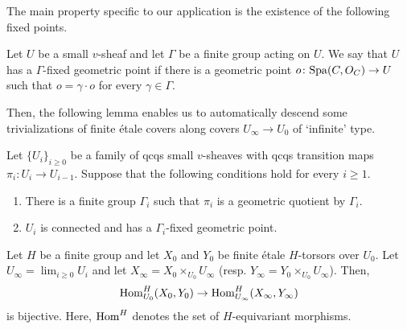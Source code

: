 \documentclass[12pt,reqno]{amsart}
\begin{document}
The main property specific to our application is the existence of the following fixed points. 

\begin{defi}
    Let $U$ be a small $v$-sheaf and let $\Gamma$ be a finite group acting on $U$. We say that $U$ has a $\Gamma$-fixed geometric point if there is a geometric point $o\colon {\operatorname{Spa}}(C,O_C) \to U$ such that $o = \gamma \cdot o$ for every $\gamma \in \Gamma$.  
\end{defi}

Then, the following lemma enables us to automatically descend some trivializations of finite \'{e}tale covers along covers $U_\infty \to U_0$ of `infinite' type. 

\begin{prop} \label{prop:descent_finite_etale_map}
    Let $\{U_i\}_{i\geq 0}$ be a family of qcqs small $v$-sheaves with qcqs transition maps $\pi_i \colon U_{i} \to U_{i-1}$. Suppose that the following conditions hold for every $i\geq 1$. 
    \begin{enumerate}
        \item There is a finite group $\Gamma_i$ such that $\pi_i$ is a geometric quotient by $\Gamma_i$. 
        \item $U_i$ is connected and has a $\Gamma_i$-fixed geometric point. 
    \end{enumerate}
    Let $H$ be a finite group and let $X_{0}$ and $Y_{0}$ be finite \'{e}tale $H$-torsors over $U_{0}$. Let $U_\infty = \lim_{i \geq 0} U_i$ and let $X_{\infty} = X_{0} \times_{U_{0}} U_{\infty}$ (resp. $Y_{\infty} = Y_{0} \times_{U_{0}} U_{\infty}$). Then,
    \[
        {\operatorname{Hom}}_{U_{0}}^H(X_{0}, Y_{0}) \to {\operatorname{Hom}}_{U_{\infty}}^H(X_{\infty}, Y_{\infty}) 
    \]
    is bijective. Here, ${\operatorname{Hom}}^H$ denotes the set of $H$-equivariant morphisms. 
\end{prop}

\end{document}
